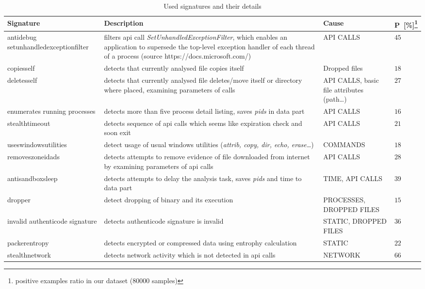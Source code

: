 \begin{table}[h]
  \centering
  \caption{Used signatures and their details}
  \begin{minipage}{\linewidth}
  \begin{tabular}{p{3.5cm}p{6cm}p{3cm}p{1.3cm}}
    \toprule
    \textbf{Signature} &
    \textbf{Description} &
    \textbf{Cause} &
    \textbf{P~[\%]\footnote[1]{positive examples ratio in our dataset ($80000$ samples)}}
    \\
    \midrule
    antidebug setunhandledexceptionfilter & filters api call \emph{SetUnhandledExceptionFilter}, which enables an application to supersede the top-level exception handler of each thread of a process  (source https://docs.microsoft.com/)  & API CALLS & $45$ \\
    \midrule
    copiesself & detects that currently analysed file copies itself & Dropped files & $18$ \\
    \midrule
    deletesself & detects that currently analysed file deletes/move itself or directory where placed, examining parameters of calls & API CALLS, basic file attributes (path\dots) & $27$ \\
    \midrule
    enumerates running processes & detects more than five process detail listing, saves \emph{pids} in data part & API CALLS & $16$ \\
    \midrule
    stealthtimeout & detects sequence of api calls which seems like expiration check and soon exit & API CALLS & $21$ \\
    \midrule
    useswindowsutilities & detect usage of usual windows utilities (\emph{attrib, copy, dir, echo, erase\dots}) & COMMANDS & $18$ \\
    \midrule
    removeszoneidads & detects attempts to remove evidence of file downloaded from internet by examining parameters of api calls& API CALLS & $28$ \\
    \midrule[0.3pt]
    \midrule[0.3pt]
    antisandboxsleep & detects attempts to delay the analysis task, saves \emph{pids} and time to data part & TIME, API CALLS & $39$ \\
    \midrule
    dropper & detect dropping of binary and its execution & PROCESSES, DROPPED FILES & $15$ \\
    \midrule
    invalid authenticode signature & detects authenticode signature is invalid & STATIC, DROPPED FILES & $36$ \\
    \midrule
    packerentropy & detects encrypted or compressed data using entrophy calculation & STATIC & $22$ \\
    \midrule
    stealthnetwork & detects network activity which is not detected in api calls & NETWORK & $66$ \\
    \bottomrule
  \end{tabular}
  \end{minipage}
  \label{tab:sigdet}
\end{table}

